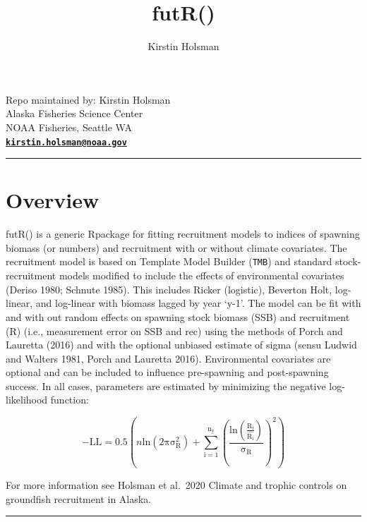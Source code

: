 \documentclass[
]{article}
\title{futR()}
\author{Kirstin Holsman}
\date{}
\begin{document}
\maketitle

{
\setcounter{tocdepth}{2}
\tableofcontents
}
Repo maintained by: Kirstin Holsman\\
Alaska Fisheries Science Center\\
NOAA Fisheries, Seattle WA\\
\textbf{\href{mailto:kirstin.holsman@noaa.gov}{\nolinkurl{kirstin.holsman@noaa.gov}}}\\

\begin{center}\rule{0.5\linewidth}{0.5pt}\end{center}

\hypertarget{overview}{%
\section{Overview}\label{overview}}

futR() is a generic Rpackage for fitting recruitment models to indices
of spawning biomass (or numbers) and recruitment with or without climate
covariates. The recruitment model is based on Template Model Builder
(\texttt{TMB}) and standard stock-recruitment models modified to include
the effects of environmental covariates (Deriso 1980; Schnute 1985).
This includes Ricker (logistic), Beverton Holt, log-linear, and
log-linear with biomass lagged by year `y-1'. The model can be fit with
and with out random effects on spawning stock biomass (SSB) and
recruitment (R) (i.e., measurement error on SSB and rec) using the
methods of Porch and Lauretta (2016) and with the optional unbiased
estimate of sigma (sensu Ludwid and Walters 1981, Porch and Lauretta
2016). Environmental covariates are optional and can be included to
influence pre-spawning and post-spawning success. In all cases,
parameters are estimated by minimizing the negative log-likelihood
function:

\[-\mathrm{LL} = 0.5\left( n\mathrm{ln(2\pi\sigma^2_R)+\sum_{i=1}^{n_y}{\left( \frac{\mathrm{ln}(\frac{R_i}{\hat{R_i}})}{\sigma_R} \right)^2}} \right)\]

For more information see Holsman et al.~2020 Climate and trophic
controls on groundfish recruitment in Alaska.

\begin{center}\rule{0.5\linewidth}{0.5pt}\end{center}
\end{document}
